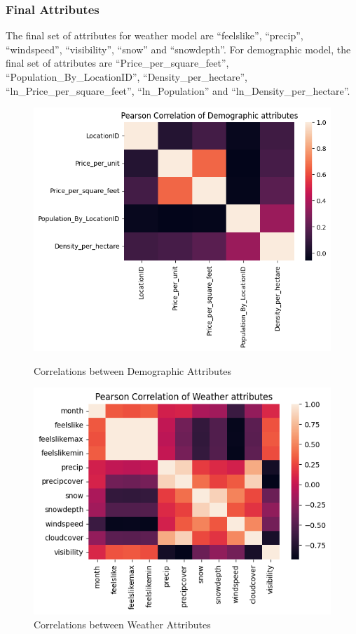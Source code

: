 \documentclass[11pt]{article}
\begin{document}
\subsubsection{Final Attributes} 
The final set of attributes for weather model are ``feelslike'', ``precip'', ``windspeed'', ``visibility'', ``snow'' and ``snowdepth''. For demographic model, the final set of attributes are ``Price\_per\_square\_feet'', ``Population\_By\_LocationID'', ``Density\_per\_hectare'', ``ln\_Price\_per\_square\_feet'', ``ln\_Population'' and ``ln\_Density\_per\_hectare''.
\begin{figure}[h]
    \centering
    \begin{minipage}{0.45\textwidth}
        \includegraphics[width=1.2\textwidth]{plots/demo_cor.png}
        \caption{Correlations between Demographic Attributes}
        \label{fig:democorr}
    \end{minipage}\hfill
    \begin{minipage}{0.45\textwidth}
        \includegraphics[width=1.2\textwidth]{plots/weather_cor.png}
        \caption{Correlations between Weather Attributes}
        \label{fig:weathercorr}
    \end{minipage}
\end{figure}
\end{document}
